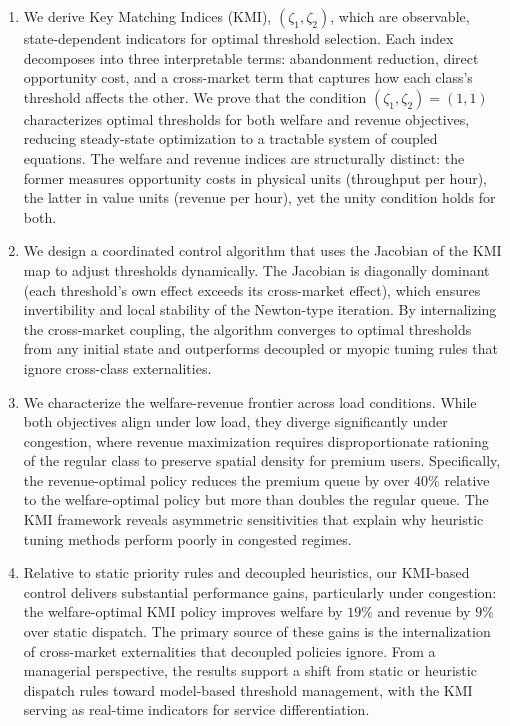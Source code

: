 \begin{enumerate}
    \item We derive Key Matching Indices (KMI), $(\zeta_1, \zeta_2)$, which are observable, state-dependent indicators for optimal threshold selection.
    Each index decomposes into three interpretable terms: abandonment reduction, direct opportunity cost, and a cross-market term that captures how each class's threshold affects the other.
    We prove that the condition $(\zeta_1, \zeta_2) = (1,1)$ characterizes optimal thresholds for both welfare and revenue objectives, reducing steady-state optimization to a tractable system of coupled equations.
    The welfare and revenue indices are structurally distinct: the former measures opportunity costs in physical units (throughput per hour), the latter in value units (revenue per hour), yet the unity condition holds for both.

    \item We design a coordinated control algorithm that uses the Jacobian of the KMI map to adjust thresholds dynamically.
    The Jacobian is diagonally dominant (each threshold's own effect exceeds its cross-market effect), which ensures invertibility and local stability of the Newton-type iteration.
    By internalizing the cross-market coupling, the algorithm converges to optimal thresholds from any initial state and outperforms decoupled or myopic tuning rules that ignore cross-class externalities.

    \item We characterize the welfare-revenue frontier across load conditions.
    While both objectives align under low load, they diverge significantly under congestion, where revenue maximization requires disproportionate rationing of the regular class to preserve spatial density for premium users.
    Specifically, the revenue-optimal policy reduces the premium queue by over $40\%$ relative to the welfare-optimal policy but more than doubles the regular queue.
    The KMI framework reveals asymmetric sensitivities that explain why heuristic tuning methods perform poorly in congested regimes.

    \item Relative to static priority rules and decoupled heuristics, our KMI-based control delivers substantial performance gains, particularly under congestion: the welfare-optimal KMI policy improves welfare by $19\%$ and revenue by $9\%$ over static dispatch.
    The primary source of these gains is the internalization of cross-market externalities that decoupled policies ignore.
    From a managerial perspective, the results support a shift from static or heuristic dispatch rules toward model-based threshold management, with the KMI serving as real-time indicators for service differentiation.
\end{enumerate}

